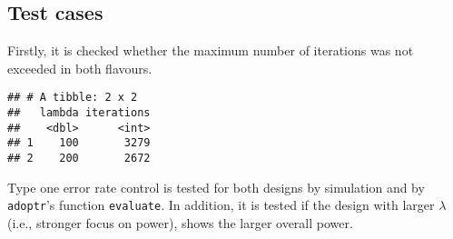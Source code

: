 \documentclass[
]{book}
\newenvironment{Shaded}{\begin{snugshade}}{\end{snugshade}}
\newcommand{\AttributeTok}[1]{\textcolor[rgb]{0.77,0.63,0.00}{#1}}
\newcommand{\FunctionTok}[1]{\textcolor[rgb]{0.00,0.00,0.00}{#1}}
\newcommand{\NormalTok}[1]{#1}
\newcommand{\SpecialCharTok}[1]{\textcolor[rgb]{0.00,0.00,0.00}{#1}}
\begin{document}
\hypertarget{test-cases-11}{%
\subsection{Test cases}\label{test-cases-11}}

Firstly, it is checked whether the maximum number of iterations was not
exceeded in both flavours.

\begin{Shaded}
\end{Shaded}

\begin{verbatim}
## # A tibble: 2 x 2
##   lambda iterations
##    <dbl>      <int>
## 1    100       3279
## 2    200       2672
\end{verbatim}

Type one error rate control is tested for both designs by simulation and by
\texttt{adoptr}'s function \texttt{evaluate}.
In addition, it is tested if the design with larger \(\lambda\) (i.e.,
stronger focus on power), shows the larger overall power.
\end{document}
